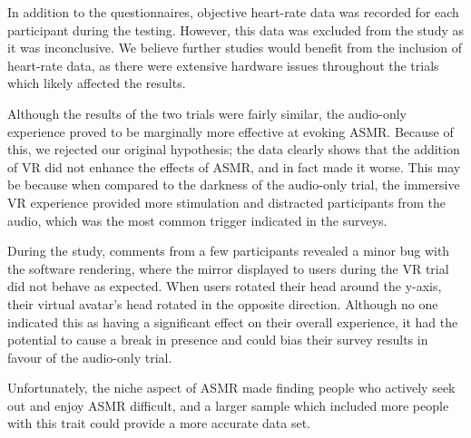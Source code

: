 \documentclass{sigchi}
\begin{document}
In addition to the questionnaires, objective heart-rate data was recorded for each participant during the testing. However, this data was excluded from the study as it was inconclusive. We believe further studies would benefit from the inclusion of heart-rate data, as there were extensive hardware issues throughout the trials which likely affected the results.

Although the results of the two trials were fairly similar, the audio-only experience proved to be marginally more effective at evoking ASMR. Because of this, we rejected our original hypothesis; the data clearly shows that the addition of VR did not enhance the effects of ASMR, and in fact made it worse. This may be because when compared to the darkness of the audio-only trial, the immersive VR experience provided more stimulation and distracted participants from the audio, which was the most common trigger indicated in the surveys.

During the study, comments from a few participants revealed a minor bug with the software rendering, where the mirror displayed to users during the VR trial did not behave as expected. When users rotated their head around the y-axis, their virtual avatar's head rotated in the opposite direction. Although no one indicated this as having a significant effect on their overall experience, it had the potential to cause a break in presence and could bias their survey results in favour of the audio-only trial.

Unfortunately, the niche aspect of ASMR made finding people who actively seek out and enjoy ASMR difficult, and a larger sample which included more people with this trait could provide a more accurate data set.



%
%
%
\end{document}
